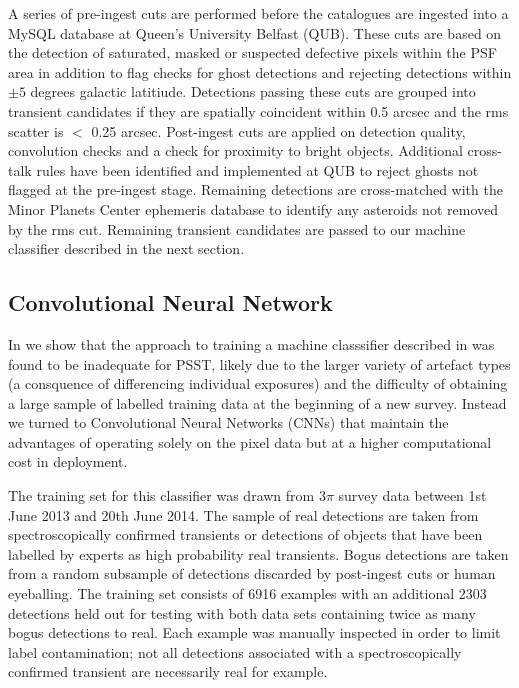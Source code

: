 \message{ !name(blank.tex)}\documentclass[a4paper,fleqn,usenatbib]{mnras}
\begin{document}
A series of pre-ingest cuts are performed before the catalogues are ingested into a MySQL database at Queen's University Belfast (QUB).  These cuts are based on the detection of saturated, masked or suspected defective pixels within the PSF area in addition to flag checks for ghost detections and rejecting detections within $\pm 5$ degrees galactic latitiude. Detections passing these cuts are grouped into transient candidates if they are spatially coincident within 0.5 arcsec and the rms scatter is $<$ 0.25 arcsec.  Post-ingest cuts are applied on detection quality, convolution checks and a check for proximity to bright objects.  Additional cross-talk rules have been identified and implemented at QUB to reject ghosts
not flagged at the pre-ingest stage.  Remaining detections are cross-matched with the Minor Planets Center ephemeris database to identify any asteroids not 
removed by the rms cut.  Remaining transient candidates are passed to our machine classifier described in the next section.

\subsection{Convolutional Neural Network}
\label{sec:cnn}

In \citet{Wright16} we show that the approach to training a machine classsifier described in \citet{Wright15} was found to be inadequate for PSST, likely due to the larger variety of artefact types (a consquence of differencing individual exposures) and the difficulty  of obtaining a large sample of labelled training data at the beginning of a new survey.  Instead we turned to Convolutional Neural Networks (CNNs) that maintain the advantages of operating solely on the pixel data but at a higher computational cost in deployment.  

The training set for this classifier was drawn from $3\pi$ survey data between 1st June 2013 and 20th June 2014.  The sample of real detections are taken from spectroscopically confirmed transients or detections of objects that have been labelled by experts as high probability real transients.  Bogus detections are taken from a random subsample of detections discarded by post-ingest cuts or human eyeballing.  The training set consists of 6916 examples with an additional 2303 detections held out for testing with both data sets containing twice as many bogus detections to real. Each example was manually inspected in order to limit label contamination; not all detections associated with a spectroscopically confirmed transient are necessarily real for example.
\end{document}
